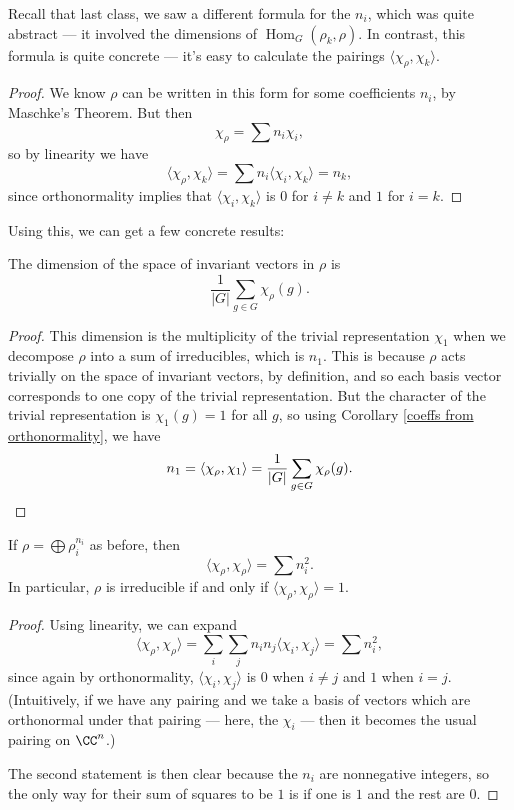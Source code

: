 Recall that last class, we saw a different formula for the $n_i$, which was quite abstract --- it involved the dimensions of $\operatorname{Hom}_G(\rho_k, \rho)$. In contrast, this formula is quite concrete --- it's easy to calculate the pairings $\langle \chi_\rho, \chi_k \rangle$. 

\begin{proof}
    We know $\rho$ can be written in this form for some coefficients $n_i$, by Maschke's Theorem. But then \[\chi_\rho = \sum n_i\chi_i,\] so by linearity we have \[\langle \chi_\rho, \chi_k \rangle = \sum n_i\langle \chi_i, \chi_k \rangle = n_k,\] since orthonormality implies that $\langle \chi_i, \chi_k \rangle$ is $0$ for $i \neq k$ and $1$ for $i = k$.
\end{proof}

Using this, we can get a few concrete results:

\begin{example}
    The dimension of the space of invariant vectors in $\rho$ is \[\frac{1}{\lvert G \rvert} \sum_{g \in G} \chi_\rho(g).\] 
\end{example}

\begin{proof}
    This dimension is the multiplicity of the trivial representation $\chi_1$ when we decompose $\rho$ into a sum of irreducibles, which is $n_1$. This is because $\rho$ acts trivially on the space of invariant vectors, by definition, and so each basis vector corresponds to one copy of the trivial representation. But the character of the trivial representation is $\chi_1(g) = 1$ for all $g$, so using Corollary \ref{coeffs from orthonormality}, we have \[n_1 = \langle \chi_\rho, \chi_1\rangle = \frac{1}{|G|} \sum_{g \in G} \chi_\rho(g). \qedhere\] 
\end{proof}

\begin{corollary}
    If $\rho = \bigoplus \rho_i^{n_i}$ as before, then \[\langle \chi_\rho, \chi_\rho \rangle = \sum n_i^2.\] In particular, $\rho$ is irreducible if and only if $\langle \chi_\rho, \chi_\rho \rangle = 1$. 
\end{corollary}

\begin{proof}
    Using linearity, we can expand \[\langle \chi_\rho, \chi_\rho \rangle = \sum_i \sum_j n_in_j \langle \chi_i, \chi_j \rangle = \sum n_i^2,\] since again by orthonormality, $\langle \chi_i, \chi_j \rangle$ is $0$ when $i \neq j$ and $1$ when $i = j$. (Intuitively, if we have any pairing and we take a basis of vectors which are orthonormal under that pairing --- here, the $\chi_i$ --- then it becomes the usual pairing on $\CC^n$.)
    
    The second statement is then clear because the $n_i$ are nonnegative integers, so the only way for their sum of squares to be $1$ is if one is $1$ and the rest are $0$.  
\end{proof}

